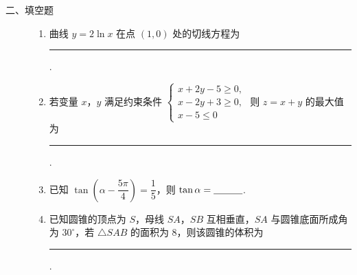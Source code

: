 \begin{description}

    \item[二、填空题]

    \begin{enumerate}[leftmargin=5pt]

      \addtocounter{enumi}{+12}

        \item 曲线 \(y=2\ln x\) 在点 \((1,0)\) 处的切线方程为\rule[-0.3ex]{3em}{0.4pt}.

        \item 若变量 \(x\)，\(y\) 满足约束条件
\(\begin{cases}
x+2y-5\ge0,\\
x-2y+3\ge0,\\
x-5\le0
\end{cases}\)
则 \(z=x+y\) 的最大值为\rule[-0.3ex]{3em}{0.4pt}.

        \item 已知 \(\tan\left(\alpha-\dfrac{5\pi}{4}\right)=\dfrac15\)，则 \(\tan\alpha=\rule[-0.3ex]{3em}{0.4pt}\).

        \item 已知圆锥的顶点为 \(S\)，母线 \(SA\)，\(SB\) 互相垂直，\(SA\) 与圆锥底面所成角为 \(30^\circ\)，若 \(\triangle SAB\) 的面积为 \(8\)，则该圆锥的体积为\rule[-0.3ex]{3em}{0.4pt}.

    \end{enumerate}

\end{description}

